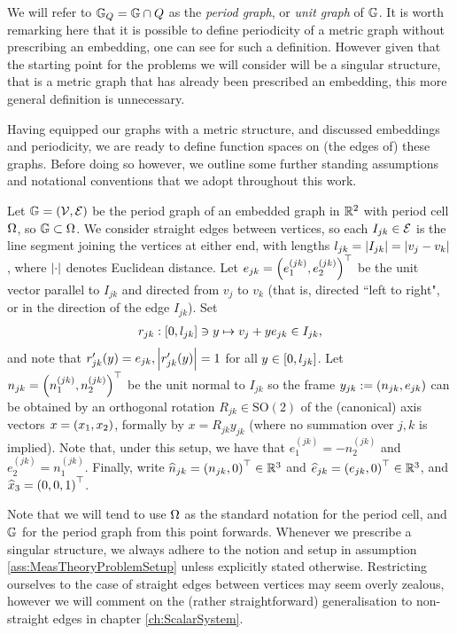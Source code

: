 We will refer to $\mathbb{G}_{Q} = \mathbb{G} \cap Q$ as the \emph{period graph}, or \emph{unit graph} of $\mathbb{G}$.
It is worth remarking here that it is possible to define periodicity of a metric graph without prescribing an embedding, one can see \cite[Chapter~4]{berkolaiko2013introduction} for such a definition.
However given that the starting point for the problems we will consider will be a singular structure, that is a metric graph that has already been prescribed an embedding, this more general definition is unnecessary.

Having equipped our graphs with a metric structure, and discussed embeddings and periodicity, we are ready to define function spaces on (the edges of) these graphs.
Before doing so however, we outline some further standing assumptions and notational conventions that we adopt throughout this work.
\begin{assumption} \label{ass:MeasTheoryProblemSetup}
	Let $\mathbb{G}=\left( \mathcal{V},\mathcal{E} \right)$ be the period graph of an embedded graph in $\mathbb{R}^2$ with period cell $\Omega$, so $\mathbb{G}\subset\Omega$.
	We consider straight edges between vertices, so each $I_{jk}\in \mathcal{E}$ is the line segment joining the vertices at either end, with lengths $l_{jk} = \left\lvert I_{jk} \right\rvert = \left\lvert v_j-v_k \right\rvert$, where $\left\lvert \cdot \right\rvert$ denotes Euclidean distance.
	Let $e_{jk} = \left( e_1^{(jk)}, e_2^{(jk)} \right)^\top$ be the unit vector parallel to $I_{jk}$ and directed from $v_j$ to $v_k$ (that is, directed ``left to right", or in the direction of the edge $I_{jk}$).
	Set
	\begin{align} \label{eq:EdgeParameterisation}
		r_{jk}:\left[ 0, l_{jk} \right] \ni y \mapsto v_j + ye_{jk} \in I_{jk},
	\end{align}
	and note that $r_{jk}'(y) = e_{jk}, \left\lvert r_{jk}'(y) \right\rvert=1$ for all $y\in\left[ 0, l_{jk} \right]$.
	Let $n_{jk} = \left( n_1^{(jk)}, n_2^{(jk)} \right)^\top$ be the unit normal to $I_{jk}$ so the frame $y_{jk} := \left( n_{jk}, e_{jk} \right)$ can be obtained by an orthogonal rotation $R_{jk}\in\mathrm{SO}(2)$ of the (canonical) axis vectors $x = \left( x_1, x_2 \right)$, formally by $x = R_{jk}y_{jk}$ (where no summation over $j,k$ is implied).
	Note that, under this setup, we have that $e_1^{(jk)} = - n_2^{(jk)}$ and $e_2^{(jk)} = n_1^{(jk)}$.
	Finally, write $\widehat{n}_{jk} = \left(  n_{jk}, 0  \right)^\top\in\mathbb{R}^3$ and $\widehat{e}_{jk} = \left(  e_{jk}, 0  \right)^\top\in\mathbb{R}^3$, and $\widehat{x}_3 = \left( 0,0,1 \right)^\top$.
\end{assumption}
Note that we will tend to use $\Omega$ as the standard notation for the period cell, and $\mathbb{G}$ for the period graph from this point forwards. 
Whenever we prescribe a singular structure, we always adhere to the notion and setup in assumption \ref{ass:MeasTheoryProblemSetup} unless explicitly stated otherwise.
Restricting ourselves to the case of straight edges between vertices may seem overly zealous, however we will comment on the (rather straightforward) generalisation to non-straight edges in chapter \ref{ch:ScalarSystem}.

